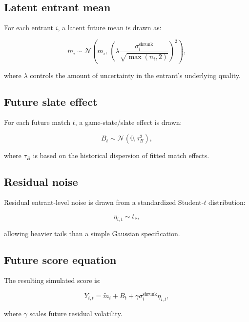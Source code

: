 \documentclass[11pt]{article}
\begin{document}
\subsection{Latent entrant mean}

For each entrant $i$, a latent future mean is drawn as:

\begin{equation}
\tilde{m}_i \sim \mathcal{N}\left(
m_i,\,
\left(
\lambda \frac{\sigma_i^{\text{shrunk}}}{\sqrt{\max(n_i,2)}}
\right)^2
\right),
\end{equation}

where $\lambda$ controls the amount of uncertainty in the entrant's underlying quality.

\subsection{Future slate effect}

For each future match $t$, a game-state/slate effect is drawn:

\begin{equation}
B_t \sim \mathcal{N}(0,\tau_B^2),
\end{equation}

where $\tau_B$ is based on the historical dispersion of fitted match effects.

\subsection{Residual noise}

Residual entrant-level noise is drawn from a standardized Student-$t$ distribution:

\begin{equation}
\eta_{i,t} \sim t_{\nu},
\end{equation}

allowing heavier tails than a simple Gaussian specification.

\subsection{Future score equation}

The resulting simulated score is:

\begin{equation}
Y_{i,t} = \tilde{m}_i + B_t + \gamma \sigma_i^{\text{shrunk}} \eta_{i,t},
\end{equation}

where $\gamma$ scales future residual volatility.
\end{document}

